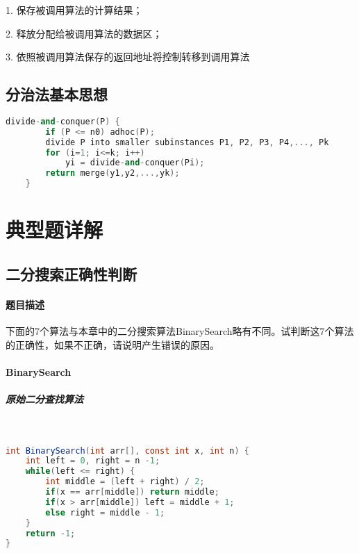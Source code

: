 \documentclass[UTF8]{ctexart}
\begin{document}
    1. 保存被调用算法的计算结果；
    
    2. 释放分配给被调用算法的数据区；
    
    3. 依照被调用算法保存的返回地址将控制转移到调用算法
    
    \subsection{分治法基本思想}
    
    \begin{lstlisting}[language=c++]
    divide-and-conquer(P) {
        if (P <= n0) adhoc(P);
        divide P into smaller subinstances P1, P2, P3, P4,..., Pk
        for (i=1; i<=k; i++)
            yi = divide-and-conquer(Pi);
        return merge(y1,y2,...,yk);
    }
    \end{lstlisting}
    
    

    \section{典型题详解}
    \subsection{二分搜索正确性判断}
    \paragraph{题目描述}

    下面的7个算法与本章中的二分搜索算法BinarySearch略有不同。试判断这7个算法的正确性，如果不正确，请说明产生错误的原因。

    \paragraph{BinarySearch}

    \subparagraph{原始二分查找算法}

    ~

\begin{small}
\begin{lstlisting}[language=java]
int BinarySearch(int arr[], const int x, int n) {
    int left = 0, right = n -1;
    while(left <= right) {
        int middle = (left + right) / 2;
        if(x == arr[middle]) return middle;
        if(x > arr[middle]) left = middle + 1;
        else right = middle - 1;
    }
    return -1;
}
\end{lstlisting}
\end{small}
\end{document}
